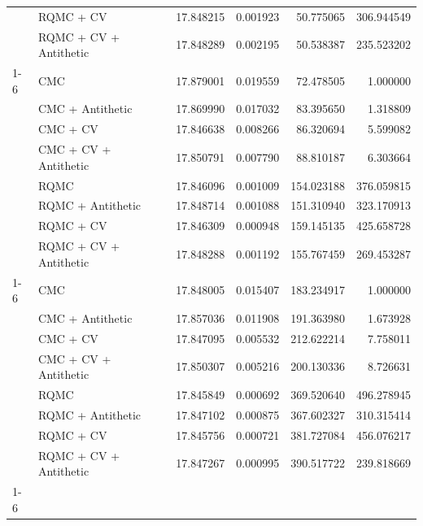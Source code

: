 \begin{tabular}{llrrrr}
 & RQMC + CV & 17.848215 & 0.001923 & 50.775065 & 306.944549 \\
 & RQMC + CV + Antithetic & 17.848289 & 0.002195 & 50.538387 & 235.523202 \\
\cline{1-6}
\multirow[t]{8}{*}{131072} & CMC & 17.879001 & 0.019559 & 72.478505 & 1.000000 \\
 & CMC + Antithetic & 17.869990 & 0.017032 & 83.395650 & 1.318809 \\
 & CMC + CV & 17.846638 & 0.008266 & 86.320694 & 5.599082 \\
 & CMC + CV + Antithetic & 17.850791 & 0.007790 & 88.810187 & 6.303664 \\
 & RQMC & 17.846096 & 0.001009 & 154.023188 & 376.059815 \\
 & RQMC + Antithetic & 17.848714 & 0.001088 & 151.310940 & 323.170913 \\
 & RQMC + CV & 17.846309 & 0.000948 & 159.145135 & 425.658728 \\
 & RQMC + CV + Antithetic & 17.848288 & 0.001192 & 155.767459 & 269.453287 \\
\cline{1-6}
\multirow[t]{8}{*}{262144} & CMC & 17.848005 & 0.015407 & 183.234917 & 1.000000 \\
 & CMC + Antithetic & 17.857036 & 0.011908 & 191.363980 & 1.673928 \\
 & CMC + CV & 17.847095 & 0.005532 & 212.622214 & 7.758011 \\
 & CMC + CV + Antithetic & 17.850307 & 0.005216 & 200.130336 & 8.726631 \\
 & RQMC & 17.845849 & 0.000692 & 369.520640 & 496.278945 \\
 & RQMC + Antithetic & 17.847102 & 0.000875 & 367.602327 & 310.315414 \\
 & RQMC + CV & 17.845756 & 0.000721 & 381.727084 & 456.076217 \\
 & RQMC + CV + Antithetic & 17.847267 & 0.000995 & 390.517722 & 239.818669 \\
\cline{1-6}
\bottomrule
\end{tabular}
